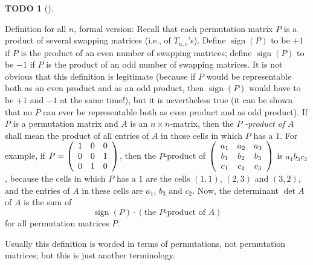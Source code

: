 \documentclass[numbers=enddot,12pt,final,onecolumn,notitlepage]{scrartcl}%
\theoremstyle{definition}
\newtheorem{quest}[theo]{TODO}
\newenvironment{todo}[1][]
{\begin{quest}[#1]\begin{leftbar}}
{\end{leftbar}\end{quest}}
\begin{document}
\begin{todo}
Definition for all $n$, formal version: Recall that each permutation matrix
$P$ is a product of several swapping matrices (i.e., of $T_{u,v}$'s). Define
$\operatorname*{sign}\left(  P\right)  $ to be $+1$ if $P$ is the product of
an even number of swapping matrices; define $\operatorname*{sign}\left(
P\right)  $ to be $-1$ if $P$ is the product of an odd number of swapping
matrices. It is not obvious that this definition is legitimate (because if $P$
would be representable both as an even product and as an odd product, then
$\operatorname*{sign}\left(  P\right)  $ would have to be $+1$ and $-1$ at the
same time!), but it is nevertheless true (it can be shown that no $P$ can ever
be representable both as even product and as odd product). If $P$ is a
permutation matrix and $A$ is an $n\times n$-matrix, then the $P$%
\textit{-product of }$A$ shall mean the product of all entries of $A$ in those
cells in which $P$ has a $1$. For example, if $P=\left(
\begin{array}
[c]{ccc}%
1 & 0 & 0\\
0 & 0 & 1\\
0 & 1 & 0
\end{array}
\right)  $, then the $P$-product of $\left(
\begin{array}
[c]{ccc}%
a_{1} & a_{2} & a_{3}\\
b_{1} & b_{2} & b_{3}\\
c_{1} & c_{2} & c_{3}%
\end{array}
\right)  $ is $a_{1}b_{3}c_{2}$, because the cells in which $P$ has a $1$ are
the cells $\left(  1,1\right)  $, $\left(  2,3\right)  $ and $\left(
3,2\right)  $, and the entries of $A$ in these cells are $a_{1}$, $b_{3}$ and
$c_{2}$. Now, the determinant $\det A$ of $A$ is the sum of%
\[
\operatorname*{sign}\left(  P\right)  \cdot\left(  \text{the }P\text{-product
of }A\right)
\]
for all permutation matrices $P$.

Usually this definition is worded in terms of permutations, not permutation
matrices; but this is just another terminology.
\end{todo}
\end{document}
